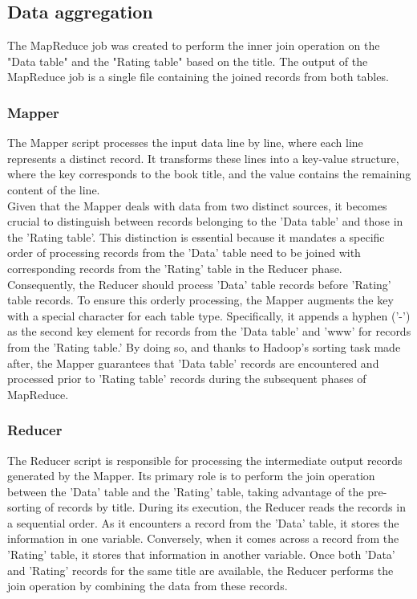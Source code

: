 \subsection*{Data aggregation}

The MapReduce job was created to perform the inner join operation on the "Data table" and the "Rating table" based on the title.
The output of the MapReduce job is a single file containing the joined records from both tables.

\subsubsection*{Mapper}
The Mapper script processes the input data line by line, where each line represents a distinct record.
It transforms these lines into a key-value structure, where the key corresponds to the book title, and
the value contains the remaining content of the line.\\
Given that the Mapper deals with data from two distinct sources,
it becomes crucial to distinguish between records belonging to the 'Data table' and those in the 'Rating table'.
This distinction is essential because it mandates a specific order of processing records from the 'Data'
table need to be joined with corresponding records from the 'Rating' table in the Reducer phase.
Consequently, the Reducer should process 'Data' table records before 'Rating' table records.
To ensure this orderly processing, the Mapper augments the key with a special character for each table type.
Specifically, it appends a hyphen ('-') as the second key element for records from the 'Data table' and 'www'
for records from the 'Rating table.'
By doing so, and thanks to Hadoop's sorting task made after, the Mapper guarantees that 'Data table' records are encountered
and processed prior to 'Rating table' records during the subsequent phases of MapReduce.

\subsubsection*{Reducer}

The Reducer script is responsible for processing the intermediate output records generated by the Mapper.
Its primary role is to perform the join operation between the 'Data' table and the 'Rating' table,
taking advantage of the pre-sorting of records by title.
During its execution, the Reducer reads the records in a sequential order.
As it encounters a record from the 'Data' table, it stores the information in one variable.
Conversely, when it comes across a record from the 'Rating' table, it stores that information in another variable.
Once both 'Data' and 'Rating' records for the same title are available,
the Reducer performs the join operation by combining the data from these records.
